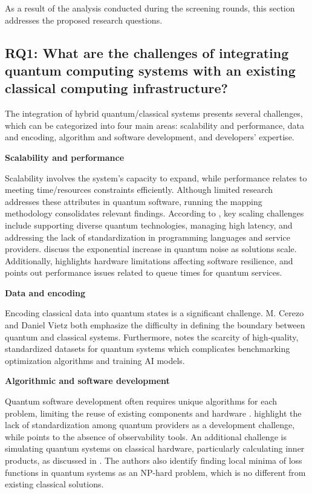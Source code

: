 As a result of the analysis conducted during the screening rounds, this section addresses the proposed research questions.

\subsection{RQ1: What are the challenges of integrating quantum computing systems with an existing classical computing infrastructure?}

The integration of hybrid quantum/classical systems presents several challenges, which can be categorized into four main areas: scalability and performance, data and encoding, algorithm and software development, and developers' expertise.

\noindent\textbf{Scalability and performance}

Scalability involves the system's capacity to expand, while performance relates to meeting time/resources constraints efficiently. Although limited research addresses these attributes in quantum software, running the mapping methodology consolidates relevant findings. According to \cite{Elsharkawy2023}, key scaling challenges include supporting diverse quantum technologies, managing high latency, and addressing the lack of standardization in programming languages and service providers. \cite{Cerezo2022, Sodhi2021} discuss the exponential increase in quantum noise as solutions scale. Additionally, \cite{Sodhi2021} highlights hardware limitations affecting software resilience, and \cite{Vietz2021} points out performance issues related to queue times for quantum services.

\noindent\textbf{Data and encoding}

Encoding classical data into quantum states is a significant challenge. M. Cerezo and Daniel Vietz \cite{Cerezo2022, Vietz2021} both emphasize the difficulty in defining the boundary between quantum and classical systems. Furthermore, \cite{Cerezo2022} notes the scarcity of high-quality, standardized datasets for quantum systems which complicates benchmarking optimization algorithms and training AI models.

\noindent\textbf{Algorithmic and software development}

Quantum software development often requires unique algorithms for each problem, limiting the reuse of existing components and hardware \cite{Moguel2022, Sodhi2021}. \cite{Moguel2022, Vietz2021} highlight the lack of standardization among quantum providers as a development challenge, while \cite{40} points to the absence of observability tools. An additional challenge is simulating quantum systems on classical hardware, particularly calculating inner products, as discussed in \cite{Cerezo2022}. The authors also identify finding local minima of loss functions in quantum systems as an NP-hard problem, which is no different from existing classical solutions.

